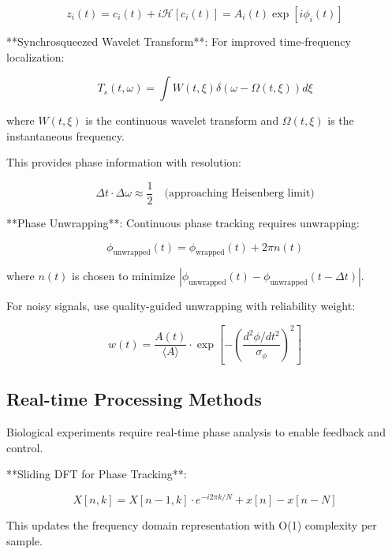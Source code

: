 \documentclass[12pt,a4paper]{report}
\begin{document}
\begin{equation}
z_i(t) = c_i(t) + i\mathcal{H}[c_i(t)] = A_i(t) \exp[i\phi_i(t)]
\end{equation}

**Synchrosqueezed Wavelet Transform**: For improved time-frequency localization:

\begin{equation}
T_s(t, \omega) = \int W(t, \xi) \delta(\omega - \Omega(t, \xi)) d\xi
\end{equation}

where $W(t, \xi)$ is the continuous wavelet transform and $\Omega(t, \xi)$ is the instantaneous frequency.

This provides phase information with resolution:

\begin{equation}
\Delta t \cdot \Delta\omega \approx \frac{1}{2} \quad \text{(approaching Heisenberg limit)}
\end{equation}

**Phase Unwrapping**: Continuous phase tracking requires unwrapping:

\begin{equation}
\phi_{\text{unwrapped}}(t) = \phi_{\text{wrapped}}(t) + 2\pi n(t)
\end{equation}

where $n(t)$ is chosen to minimize $|\phi_{\text{unwrapped}}(t) - \phi_{\text{unwrapped}}(t-\Delta t)|$.

For noisy signals, use quality-guided unwrapping with reliability weight:

\begin{equation}
w(t) = \frac{A(t)}{\langle A \rangle} \cdot \exp\left[-\left(\frac{d^2\phi/dt^2}{\sigma_\phi}\right)^2\right]
\end{equation}

\subsection{Real-time Processing Methods}

Biological experiments require real-time phase analysis to enable feedback and control.

**Sliding DFT for Phase Tracking**:

\begin{equation}
X[n, k] = X[n-1, k] \cdot e^{-i2\pi k/N} + x[n] - x[n-N]
\end{equation}

This updates the frequency domain representation with O(1) complexity per sample.
\end{document}
